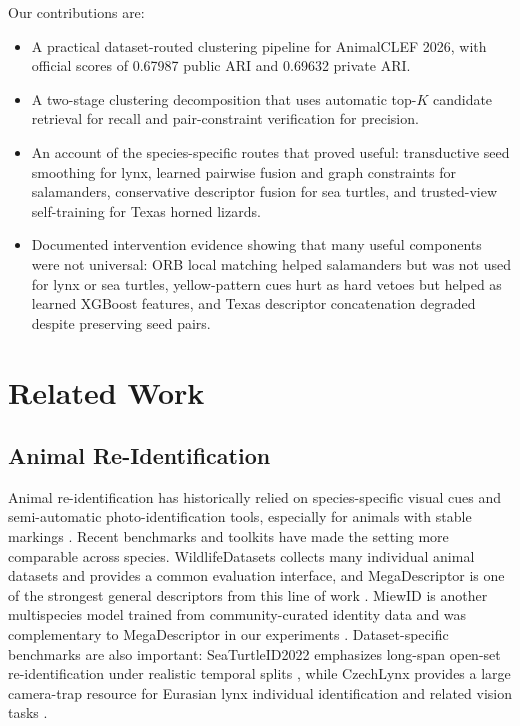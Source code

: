 \documentclass{ceurart}
\begin{document}
Our contributions are:
\begin{itemize}[leftmargin=*]
  \item A practical dataset-routed clustering pipeline for AnimalCLEF 2026, with official scores of 0.67987 public ARI and 0.69632 private ARI.
  \item A two-stage clustering decomposition that uses automatic top-$K$ candidate retrieval for recall and pair-constraint verification for precision.
  \item An account of the species-specific routes that proved useful: transductive seed smoothing for lynx, learned pairwise fusion and graph constraints for salamanders, conservative descriptor fusion for sea turtles, and trusted-view self-training for Texas horned lizards.
  \item Documented intervention evidence showing that many useful components were not universal: ORB local matching helped salamanders but was not used for lynx or sea turtles, yellow-pattern cues hurt as hard vetoes but helped as learned XGBoost features, and Texas descriptor concatenation degraded despite preserving seed pairs.
\end{itemize}

\section{Related Work}
\subsection{Animal Re-Identification}
Animal re-identification has historically relied on species-specific visual cues and semi-automatic photo-identification tools, especially for animals with stable markings \cite{schneider2019animalreid}. Recent benchmarks and toolkits have made the setting more comparable across species. WildlifeDatasets collects many individual animal datasets and provides a common evaluation interface, and MegaDescriptor is one of the strongest general descriptors from this line of work \cite{wildlifedatasets}. MiewID is another multispecies model trained from community-curated identity data and was complementary to MegaDescriptor in our experiments \cite{miewid}. Dataset-specific benchmarks are also important: SeaTurtleID2022 emphasizes long-span open-set re-identification under realistic temporal splits \cite{seaturtleid2022}, while CzechLynx provides a large camera-trap resource for Eurasian lynx individual identification and related vision tasks \cite{czechlynx}.
\end{document}
